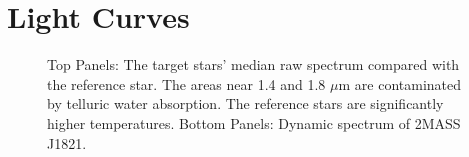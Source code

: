 \documentclass[twocolumn]{aastex6}
\begin{document}
\section{Light Curves}

\begin{figure}[!t]
\centering
{}
	\caption{Top Panels: The target stars' median raw spectrum compared with the reference star. The areas near 1.4 and 1.8 $\mu$m are contaminated by telluric water absorption. The reference stars are significantly higher temperatures. Bottom Panels: Dynamic spectrum of 2MASS J1821.}
	\label{fig:specphot}
	\vspace{0.1in}
\end{figure} 
\end{document}
